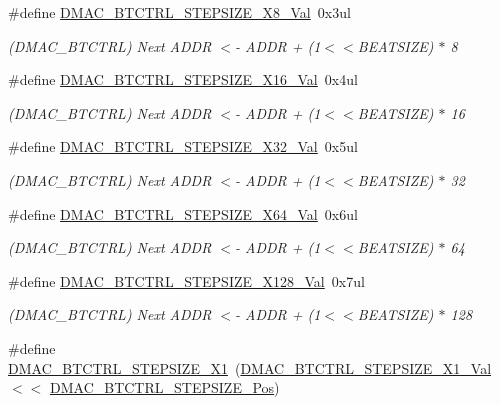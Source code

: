 \begin{DoxyCompactItemize}
\#define \mbox{\hyperlink{group___s_a_m_d21___d_m_a_c_ga426419179c0a52bd86e40764396e365d}{D\+M\+A\+C\+\_\+\+B\+T\+C\+T\+R\+L\+\_\+\+S\+T\+E\+P\+S\+I\+Z\+E\+\_\+\+X8\+\_\+\+Val}}~0x3ul
\begin{DoxyCompactList}\small\item\em (D\+M\+A\+C\+\_\+\+B\+T\+C\+T\+RL) Next A\+D\+DR $<$-\/ A\+D\+DR + (1$<$$<$B\+E\+A\+T\+S\+I\+ZE) $\ast$ 8 \end{DoxyCompactList}\item 
\#define \mbox{\hyperlink{group___s_a_m_d21___d_m_a_c_ga6be80c72116b230cffb8afd5874cae02}{D\+M\+A\+C\+\_\+\+B\+T\+C\+T\+R\+L\+\_\+\+S\+T\+E\+P\+S\+I\+Z\+E\+\_\+\+X16\+\_\+\+Val}}~0x4ul
\begin{DoxyCompactList}\small\item\em (D\+M\+A\+C\+\_\+\+B\+T\+C\+T\+RL) Next A\+D\+DR $<$-\/ A\+D\+DR + (1$<$$<$B\+E\+A\+T\+S\+I\+ZE) $\ast$ 16 \end{DoxyCompactList}\item 
\#define \mbox{\hyperlink{group___s_a_m_d21___d_m_a_c_gabc372a6f4800c89ffc625b791a95a710}{D\+M\+A\+C\+\_\+\+B\+T\+C\+T\+R\+L\+\_\+\+S\+T\+E\+P\+S\+I\+Z\+E\+\_\+\+X32\+\_\+\+Val}}~0x5ul
\begin{DoxyCompactList}\small\item\em (D\+M\+A\+C\+\_\+\+B\+T\+C\+T\+RL) Next A\+D\+DR $<$-\/ A\+D\+DR + (1$<$$<$B\+E\+A\+T\+S\+I\+ZE) $\ast$ 32 \end{DoxyCompactList}\item 
\#define \mbox{\hyperlink{group___s_a_m_d21___d_m_a_c_ga4c940b8055fe3e170f6d069523d1dc5a}{D\+M\+A\+C\+\_\+\+B\+T\+C\+T\+R\+L\+\_\+\+S\+T\+E\+P\+S\+I\+Z\+E\+\_\+\+X64\+\_\+\+Val}}~0x6ul
\begin{DoxyCompactList}\small\item\em (D\+M\+A\+C\+\_\+\+B\+T\+C\+T\+RL) Next A\+D\+DR $<$-\/ A\+D\+DR + (1$<$$<$B\+E\+A\+T\+S\+I\+ZE) $\ast$ 64 \end{DoxyCompactList}\item 
\#define \mbox{\hyperlink{group___s_a_m_d21___d_m_a_c_gac60f6c18ae8ba088c4b1c09764074bb5}{D\+M\+A\+C\+\_\+\+B\+T\+C\+T\+R\+L\+\_\+\+S\+T\+E\+P\+S\+I\+Z\+E\+\_\+\+X128\+\_\+\+Val}}~0x7ul
\begin{DoxyCompactList}\small\item\em (D\+M\+A\+C\+\_\+\+B\+T\+C\+T\+RL) Next A\+D\+DR $<$-\/ A\+D\+DR + (1$<$$<$B\+E\+A\+T\+S\+I\+ZE) $\ast$ 128 \end{DoxyCompactList}\item 
\#define \mbox{\hyperlink{group___s_a_m_d21___d_m_a_c_gaefe5b83bcb65520cf0133410134c0613}{D\+M\+A\+C\+\_\+\+B\+T\+C\+T\+R\+L\+\_\+\+S\+T\+E\+P\+S\+I\+Z\+E\+\_\+\+X1}}~(\mbox{\hyperlink{group___s_a_m_d21___d_m_a_c_gaa089586d04726d1fe2a2b572764d51e3}{D\+M\+A\+C\+\_\+\+B\+T\+C\+T\+R\+L\+\_\+\+S\+T\+E\+P\+S\+I\+Z\+E\+\_\+\+X1\+\_\+\+Val}}   $<$$<$ \mbox{\hyperlink{group___s_a_m_d21___d_m_a_c_gacf7558693207543fbd9048f7f76fa238}{D\+M\+A\+C\+\_\+\+B\+T\+C\+T\+R\+L\+\_\+\+S\+T\+E\+P\+S\+I\+Z\+E\+\_\+\+Pos}})
$$
\end{DoxyCompactItemize}
